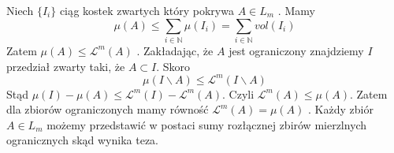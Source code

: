 Niech $\{I_i\}$ ciąg kostek zwartych który pokrywa $A \in L_m$ . Mamy $$ 
	\mu(A) \leq \sum_{i \in \mathbb{N}} \mu(I_i) = \sum_{i \in \mathbb{N}} vol(I_i)
$$
Zatem $\mu(A) \leq \mathcal{L}^m(A)$ . Zakładając, że $A$ jest ograniczony znajdziemy $I$ przedział zwarty taki, że $A \subset I$. Skoro $$
	\mu(I \backslash A) \leq \mathcal{L}^m(I \backslash A) 
$$ Stąd $\mu(I) - \mu(A) \leq \mathcal{L}^m(I) - \mathcal{L}^m(A)$. Czyli $\mathcal{L}^m(A) \leq \mu(A)$. Zatem dla zbiorów ograniczonych mamy równość $\mathcal{L}^m(A) = \mu(A)$ . Każdy zbiór $A \in L_m$ możemy przedstawić w postaci sumy rozłącznej zbirów mierzlnych ogranicznych skąd wynika teza.